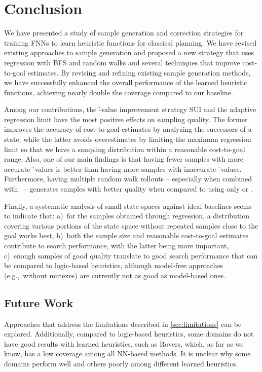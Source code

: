 \chapter{Conclusion}
\label{sec:conclusion}

We have presented a study of sample generation and correction strategies for training FNNs to learn heuristic functions for classical planning. We have revised existing approaches to sample generation and proposed a new strategy that uses regression with BFS and random walks and several techniques that improve cost-to-goal estimates. By revising and refining existing sample generation methods, we have successfully enhanced the overall performance of the learned heuristic functions, achieving nearly double the coverage compared to our baseline.

Among our contributions, the \h-value improvement strategy SUI and the adaptive regression limit \rlmeanfx have the most positive effects on sampling quality. The former improves the accuracy of cost-to-goal estimates by analyzing the successors of a state, while the latter avoids overestimates by limiting the maximum regression limit so that we have a sampling distribution within a reasonable cost-to-goal range. Also, one of our main findings is that having fewer samples with more accurate \h-values is better than having more samples with inaccurate \h-values. Furthermore, having multiple random walk rollouts -- especially when combined with \bfs~-- generates samples with better quality when compared to using only \bfs or \dfs.

Finally, a systematic analysis of small state spaces against ideal baselines seems to indicate that: a)~for the samples obtained through regression, a distribution covering various portions of the state space without repeated samples close to the goal works best, b)~both the sample size and reasonable cost-to-goal estimates contribute to search performance, with the latter being more important, c)~enough samples of good quality translate to good search performance that can be compared to logic-based heuristics, although model-free approaches (e.g.,~without mutexes) are currently not as good as model-based ones.

\section{Future Work}
\label{sec:future-work}

Approaches that address the limitations described in \cref{sec:limitations} can be explored. Additionally, compared to logic-based heuristics, some domains do not have good results with learned heuristics, such as Rovers, which, as far as we know, has a low coverage among all NN-based methods. It is unclear why some domains perform well and others poorly among different learned heuristics.

